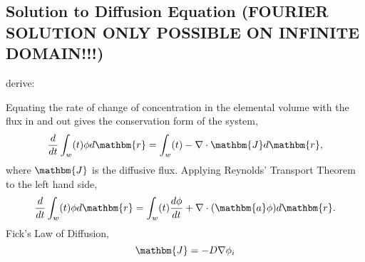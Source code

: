 
\subsection{Solution to Diffusion Equation (FOURIER SOLUTION ONLY POSSIBLE ON INFINITE DOMAIN!!!)}


derive:


Equating the rate of change of concentration in the elemental volume with the flux in and out gives the conservation form of the system,
%
\begin{equation}
\frac{d}{dt} \int_w(t) \phi d\mathbm{r} = \int_w(t) - \nabla \cdot \mathbm{J} d \mathbm{r},
\end{equation}
%
where $\mathbm{J}$ is the diffusive flux. Applying Reynolds' Transport Theorem \cite{acheson1990elementary} to the left hand side,
%
\begin{equation}
\frac{d}{dt} \int_w(t) \phi d\mathbm{r} = \int_w(t) \frac{d\phi}{dt} + \nabla \cdot (\mathbm{a}\phi) d \mathbm{r}.
\end{equation}
%
Fick's Law of Diffusion,
%
\begin{equation}
\mathbm{J} = - D\nabla \phi_i
\end{equation}


